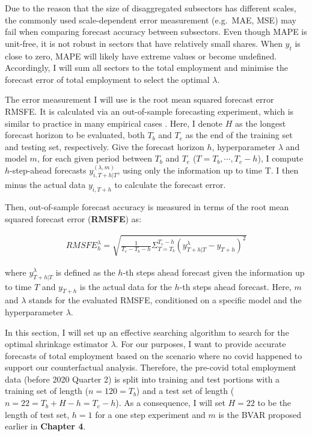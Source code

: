 \documentclass{monashthesis}
\begin{document}
Due to the reason that the size of disaggregated subsectors has different scales, the commonly used scale-dependent error measurement (e.g.~MAE, MSE) may fail when comparing forecast accuracy between subsectors. Even though MAPE is unit-free, it is not robust in sectors that have relatively small shares. When \(y_t\) is close to zero, MAPE will likely have extreme values or become undefined. Accordingly, I will sum all sectors to the total employment and minimise the forecast error of total employment to select the optimal \(\lambda\).

The error measurement I will use is the root mean squared forecast error RMSFE. It is calculated via an out-of-sample forecasting experiment, which is similar to practice in many empirical cases \autocite{banbura2010large,koop2013}. Here, I denote \(H\) as the longest forecast horizon to be evaluated, both \(T_{b}\) and \(T_{e}\) as the end of the training set and testing set, respectively. Give the forecast horizon \(h\), hyperparameter \(\lambda\) and model \(m\), for each given period between \(T_{b}\) and \(T_{e}\) (\(T=T_b,\cdots,T_{e}-h\)), I compute \(h\)-step-ahead forecasts \({y}_{i,T+h|T}^{(\lambda,m)}\), using only the information up to time T. I then minus the actual data \(y_{i,T+h}\) to calculate the forecast error.

Then, out-of-sample forecast accuracy is measured in terms of the root mean squared forecast error (\textbf{RMSFE}) as:

\[
\begin{aligned}
RMSFE^{\lambda}_{h}=\sqrt{\frac{1}{T_e-T_b-h}\Sigma^{T_{e}-h}_{T=T_{b}}({y}_{T+h|T}^{\lambda}-y_{T+h})^2}
\end{aligned}
\]

where \({y}_{T+h|T}^{\lambda}\) is defined as the \(h\)-th steps ahead forecast given the information up to time \(T\) and \(y_{T+h}\) is the actual data for the \(h\)-th steps ahead forecast. Here, \(m\) and \(\lambda\) stands for the evaluated RMSFE, conditioned on a specific model and the hyperparameter \(\lambda\).

In this section, I will set up an effective searching algorithm to search for the optimal shrinkage estimator \(\lambda\). For our purposes, I want to provide accurate forecasts of total employment based on the scenario where no covid happened to support our counterfactual analysis. Therefore, the pre-covid total employment data (before 2020 Quarter 2) is split into training and test portions with a training set of length (\(n=120=T_b\)) and a test set of length (\(n=22=T_b+H-h=T_e-h\)). As a consequence, I will set \(H=22\) to be the length of test set, \(h=1\) for a one step experiment and \(m\) is the BVAR proposed earlier in \textbf{Chapter 4}.
\end{document}
